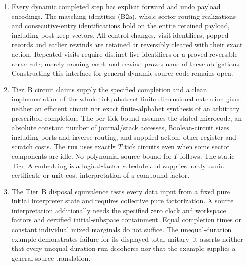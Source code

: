 \begin{enumerate}
\item Every dynamic completed step has explicit forward and undo payload encodings. The matching identities (B2a), whole-sector routing realizations and consecutive-entry identifications hold on the entire retained payload, including post-keep vectors. All control changes, visit identifiers, popped records and earlier rewinds are retained or reversibly cleared with their exact action. Repeated visits require distinct live identifiers or a proved reversible reuse rule; merely naming mark and rewind proves none of these obligations. Constructing this interface for general dynamic source code remains open.
\item Tier~B circuit claims supply the specified completion and a clean implementation of the whole tick; abstract finite-dimensional extension gives neither an efficient circuit nor exact finite-alphabet synthesis of an arbitrary prescribed completion. The per-tick bound assumes the stated microcode, an absolute constant number of journal/stack accesses, Boolean-circuit sizes including ports and inverse routing, and supplied action, other-register and scratch costs. The run uses exactly $T$ tick circuits even when some sector components are idle. No polynomial source bound for $T$ follows. The static Tier~A embedding is a logical-factor schedule and supplies no dynamic certificate or unit-cost interpretation of a compound factor.
\item The Tier~B disposal equivalence tests every data input from a fixed pure initial interpreter state and requires collective pure factorization. A source interpretation additionally needs the specified zero clock and workspace factors and certified initial-subspace containment. Equal completion times or constant individual mixed marginals do not suffice. The unequal-duration example demonstrates failure for its displayed total unitary; it asserts neither that every unequal-duration run decoheres nor that the example supplies a general source translation.
\end{enumerate}

